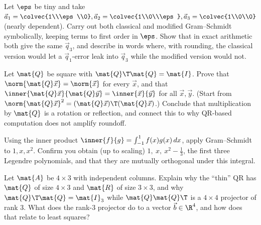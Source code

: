 \begin{exercise}
Let $\eps$ be tiny and take
$\vec{a}_1=\colvec{1\\\eps\\0},\vec{a}_2=\colvec{1\\0\\\eps},\vec{a}_3=\colvec{1\\0\\0}$
(nearly dependent). Carry out both classical and modified Gram--Schmidt symbolically,
keeping terms to first order in $\eps$. Show that in exact arithmetic both give the same
$\vec{q}_3$, and describe in words where, with rounding, the classical version would let
a $\vec{q}_1$-error leak into $\vec{q}_3$ while the modified version would not.
\end{exercise}

\begin{exercise}
Let $\mat{Q}$ be square with $\mat{Q}\T\mat{Q}=\mat{I}$. Prove that
$\norm{\mat{Q}\vec{x}}=\norm{\vec{x}}$ for every $\vec{x}$, and that
$\inner{\mat{Q}\vec{x}}{\mat{Q}\vec{y}}=\inner{\vec{x}}{\vec{y}}$ for all $\vec{x},
\vec{y}$. (Start from $\norm{\mat{Q}\vec{x}}^2=(\mat{Q}\vec{x})\T(\mat{Q}\vec{x})$.)
Conclude that multiplication by $\mat{Q}$ is a rotation or reflection, and connect this
to why QR-based computation does not amplify roundoff.
\end{exercise}

\begin{exercise}
Using the inner product $\inner{f}{g}=\int_{-1}^{1}f(x)g(x)\,dx$, apply Gram--Schmidt
to $1,x,x^2$. Confirm you obtain (up to scaling) $1,\ x,\ x^2-\tfrac13$, the first three
Legendre polynomials, and that they are mutually orthogonal under this integral.
\end{exercise}

\begin{exercise}
Let $\mat{A}$ be $4\times 3$ with independent columns. Explain why the ``thin'' QR has
$\mat{Q}$ of size $4\times 3$ and $\mat{R}$ of size $3\times 3$, and why
$\mat{Q}\T\mat{Q}=\mat{I}_3$ while $\mat{Q}\mat{Q}\T$ is a $4\times 4$ projector of rank
$3$. What does the rank-$3$ projector do to a vector $\vec{b}\in\R^4$, and how does that
relate to least squares?
\end{exercise}
